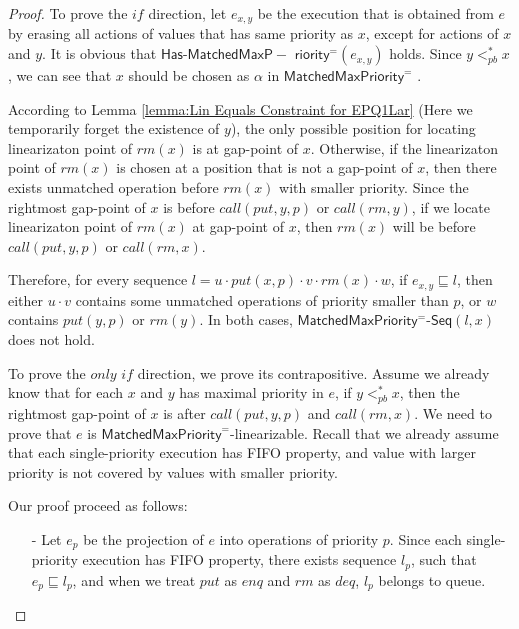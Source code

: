 \begin {proof}
To prove the $\textit{if}$ direction, let $e_{x,y}$ be the execution that is obtained from $e$ by erasing all actions of values that has same priority as $x$, except for actions of $x$ and $y$. It is obvious that $\mathsf{Has\text{-}MatchedMaxP-}$ $\mathsf{riority}^{=}(e_{x,y})$ holds. Since $y <_{\textit{pb}}^* x$, we can see that $x$ should be chosen as $\alpha$ in $\mathsf{MatchedMaxPriority}^{=}$ .

According to Lemma \ref{lemma:Lin Equals Constraint for EPQ1Lar} (Here we temporarily forget the existence of $y$), the only possible position for locating linearizaton point of $\textit{rm}(x)$ is at gap-point of $x$. Otherwise, if the linearizaton point of $\textit{rm}(x)$ is chosen at a position that is not a gap-point of $x$, then there exists unmatched operation before $\textit{rm}(x)$ with smaller priority. Since the rightmost gap-point of $x$ is before $\textit{call}(\textit{put},y,p)$ or $\textit{call}(\textit{rm},y)$, if we locate linearizaton point of $\textit{rm}(x)$ at gap-point of $x$, then $\textit{rm}(x)$ will be before $\textit{call}(\textit{put},y,p)$ or $\textit{call}(\textit{rm},x)$.

Therefore, for every sequence $l = u \cdot \textit{put}(x,p) \cdot v \cdot \textit{rm}(x) \cdot w$, if $e_{x,y} \sqsubseteq l$, then either $u \cdot v$ contains some unmatched operations of priority smaller than $p$, or $w$ contains $\textit{put}(y,p)$ or $\textit{rm}(y)$. In both cases, $\mathsf{MatchedMaxPriority^{=}\text{-}Seq}(l,x)$ does not hold.

To prove the $\textit{only if}$ direction, we prove its contrapositive. Assume we already know that for each $x$ and $y$ has maximal priority in $e$, if $y <_{\textit{pb}}^* x$, then the rightmost gap-point of $x$ is after $\textit{call}(\textit{put},y,p)$ and $\textit{call}(\textit{rm},x)$. We need to prove that $e$ is $\mathsf{MatchedMaxPriority}^{=}$-linearizable. Recall that we already assume that each single-priority execution has FIFO property, and value with larger priority is not covered by values with smaller priority.

Our proof proceed as follows:

\begin{itemize}
\setlength{\itemsep}{0.5pt}
\item[-] Let $e_{p}$ be the projection of $e$ into operations of priority $p$. Since each single-priority execution has FIFO property, there exists sequence $l_{p}$, such that $e_{p} \sqsubseteq l_{p}$, and when we treat $\textit{put}$ as $\textit{enq}$ and $\textit{rm}$ as $\textit{deq}$, $l_{p}$ belongs to queue.


\end{itemize}
\end{proof}
